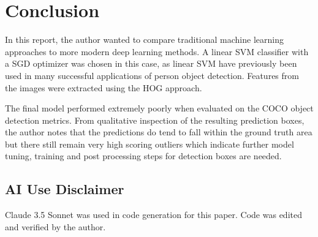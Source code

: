 \section{Conclusion}

In this report, the author wanted to compare traditional machine learning approaches to more modern deep learning methods.
A linear SVM classifier with a SGD optimizer was chosen in this case, as linear SVM have previously been used in many successful applications of person object detection.
Features from the images were extracted using the HOG approach.

The final model performed extremely poorly when evaluated on the COCO object detection metrics. 
From qualitative inspection of the resulting prediction boxes, the author notes that the predictions do tend to fall within the ground truth area but there still remain very high scoring outliers which indicate further model tuning, training and post processing steps for detection boxes are needed.

\subsection{AI Use Disclaimer}
Claude 3.5 Sonnet was used in code generation for this paper. Code was edited and verified by the author.